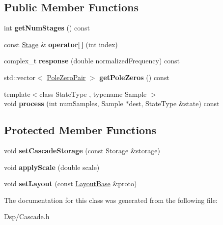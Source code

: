 \subsection*{Public Member Functions}
\begin{DoxyCompactItemize}
\item 
\hypertarget{classDsp_1_1Cascade_a00c16891b0cdb0bd3fcdf66443fdf36c}{int {\bfseries get\-Num\-Stages} () const }\label{classDsp_1_1Cascade_a00c16891b0cdb0bd3fcdf66443fdf36c}

\item 
\hypertarget{classDsp_1_1Cascade_a32a5c345c45ec15f5687ea96615dd9db}{const \hyperlink{structDsp_1_1Cascade_1_1Stage}{Stage} \& {\bfseries operator\mbox{[}$\,$\mbox{]}} (int index)}\label{classDsp_1_1Cascade_a32a5c345c45ec15f5687ea96615dd9db}

\item 
\hypertarget{classDsp_1_1Cascade_a974f82c601c69e6c561f781b30b25373}{complex\-\_\-t {\bfseries response} (double normalized\-Frequency) const }\label{classDsp_1_1Cascade_a974f82c601c69e6c561f781b30b25373}

\item 
\hypertarget{classDsp_1_1Cascade_a449c8308581d28bb2e6a663d0cf81060}{std\-::vector$<$ \hyperlink{structDsp_1_1PoleZeroPair}{Pole\-Zero\-Pair} $>$ {\bfseries get\-Pole\-Zeros} () const }\label{classDsp_1_1Cascade_a449c8308581d28bb2e6a663d0cf81060}

\item 
\hypertarget{classDsp_1_1Cascade_a0ec5dc1cffbb3da841bab0bbc5a25556}{{\footnotesize template$<$class State\-Type , typename Sample $>$ }\\void {\bfseries process} (int num\-Samples, Sample $\ast$dest, State\-Type \&state) const }\label{classDsp_1_1Cascade_a0ec5dc1cffbb3da841bab0bbc5a25556}

\end{DoxyCompactItemize}
\subsection*{Protected Member Functions}
\begin{DoxyCompactItemize}
\item 
\hypertarget{classDsp_1_1Cascade_a948e43def47b06c27afbb0378929f9f9}{void {\bfseries set\-Cascade\-Storage} (const \hyperlink{structDsp_1_1Cascade_1_1Storage}{Storage} \&storage)}\label{classDsp_1_1Cascade_a948e43def47b06c27afbb0378929f9f9}

\item 
\hypertarget{classDsp_1_1Cascade_acf9baaa834b93d0de7d0fa6f91003535}{void {\bfseries apply\-Scale} (double scale)}\label{classDsp_1_1Cascade_acf9baaa834b93d0de7d0fa6f91003535}

\item 
\hypertarget{classDsp_1_1Cascade_a336a0d3eacac9bf8991ef9bcd0e4c3d5}{void {\bfseries set\-Layout} (const \hyperlink{classDsp_1_1LayoutBase}{Layout\-Base} \&proto)}\label{classDsp_1_1Cascade_a336a0d3eacac9bf8991ef9bcd0e4c3d5}

\end{DoxyCompactItemize}


The documentation for this class was generated from the following file\-:\begin{DoxyCompactItemize}
\item 
Dsp/Cascade.\-h\end{DoxyCompactItemize}
